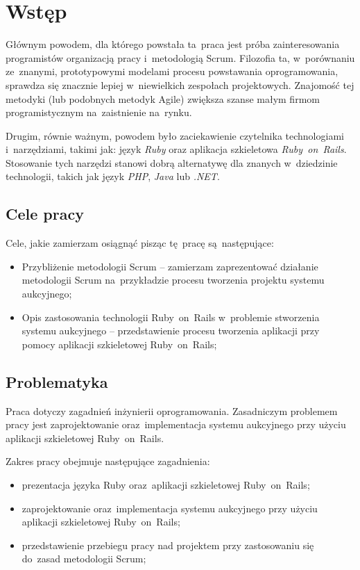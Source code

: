 \newpage

\section*{Wstęp}

Głównym powodem, dla którego powstała ta~praca jest próba zainteresowania programistów organizacją pracy i~metodologią Scrum. Filozofia ta, w~porównaniu ze~znanymi, prototypowymi modelami procesu powstawania oprogramowania, sprawdza się znacznie lepiej w~niewielkich zespołach projektowych. Znajomość tej metodyki (lub podobnych metodyk Agile) zwiększa szanse małym firmom programistycznym na~zaistnienie na~rynku.


Drugim, równie ważnym, powodem było zaciekawienie czytelnika technologiami i~narzędziami, takimi jak: język \textit{Ruby} oraz aplikacja szkieletowa \textit{Ruby~on~Rails}. Stosowanie tych narzędzi stanowi dobrą alternatywę dla znanych w~dziedzinie technologii, takich jak język \textit{PHP}, \textit{Java} lub \textit{.NET}.


\subsection*{Cele pracy}

Cele, jakie zamierzam osiągnąć pisząc tę~pracę są~następujące:

\begin{itemize}
  \item Przybliżenie metodologii Scrum -- zamierzam zaprezentować działanie metodologii Scrum na~przykładzie procesu tworzenia projektu systemu aukcyjnego;
  \item Opis zastosowania technologii Ruby~on~Rails w~problemie stworzenia systemu aukcyjnego -- przedstawienie procesu tworzenia aplikacji przy pomocy aplikacji szkieletowej Ruby~on~Rails;
\end{itemize}

\subsection*{Problematyka}

Praca dotyczy zagadnień inżynierii oprogramowania. Zasadniczym problemem pracy jest zaprojektowanie oraz~implementacja systemu aukcyjnego przy użyciu aplikacji szkieletowej Ruby~on~Rails.

Zakres pracy obejmuje następujące zagadnienia:

\begin{itemize}
  \item prezentacja języka Ruby oraz~aplikacji szkieletowej Ruby~on~Rails;
  \item zaprojektowanie oraz~implementacja systemu aukcyjnego przy użyciu aplikacji szkieletowej Ruby~on~Rails;
  \item przedstawienie przebiegu pracy nad projektem przy zastosowaniu się do~zasad metodologii Scrum;
\end{itemize}

